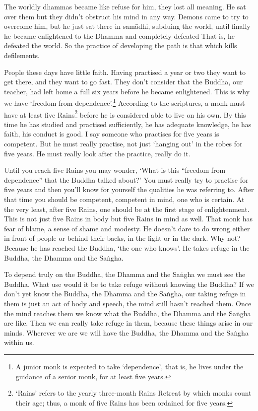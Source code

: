 The worldly dhammas became like refuse for him, they lost all meaning. He sat over them but they didn't obstruct his mind in any way. Demons came to try to overcome him, but he just sat there in sam\=adhi, subduing the world, until finally he became enlightened to the Dhamma and completely defeated  That is, he defeated the world. So the practice of developing the path is that which kills defilements. 

People these days have little faith. Having practised a year or two they want to get there, and they want to go fast. They don't consider that the Buddha, our teacher, had left home a full six years before he became enlightened. This is why we have `freedom from dependence'.\footnote{A junior monk is expected to take `dependence', that is, he lives under the guidance of a senior monk, for at least five years.} According to the scriptures, a monk must have at least five Rains\footnote{`Rains' refers to the yearly three-month Rains Retreat by which monks count their age; thus, a monk of five Rains has been ordained for five years. } before he is considered able to live on his own. By this time he has studied and practised sufficiently, he has adequate knowledge, he has faith, his conduct is good. I say someone who practises for five years is competent. But he must really practise, not just `hanging out' in the robes for five years. He must really look after the practice, really do it. 

Until you reach five Rains you may wonder, `What is this ``freedom from dependence'' that the Buddha talked about?' You must really try to practise for five years and then you'll know for yourself the qualities he was referring to. After that time you should be competent, competent in mind, one who is certain. At the very least, after five Rains, one should be at the first stage of enlightenment. This is not just five Rains in body but five Rains in mind as well. That monk has fear of blame, a sense of shame and modesty. He doesn't dare to do wrong either in front of people or behind their backs, in the light or in the dark. Why not? Because he has reached the Buddha, `the one who knows'. He takes refuge in the Buddha, the Dhamma and the Sa\.ngha. 

To depend truly on the Buddha, the Dhamma and the Sa\.ngha we must see the Buddha. What use would it be to take refuge without knowing the Buddha? If we don't yet know the Buddha, the Dhamma and the Sa\.ngha, our taking refuge in them is just an act of body and speech, the mind still hasn't reached them. Once the mind reaches them we know what the Buddha, the Dhamma and the Sa\.ngha are like. Then we can really take refuge in them, because these things arise in our minds. Wherever we are we will have the Buddha, the Dhamma and the Sa\.ngha within us. 


